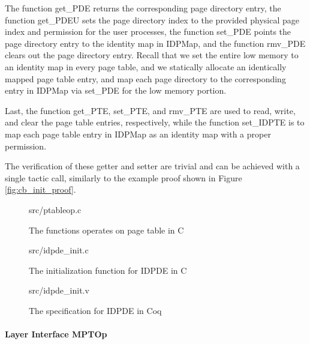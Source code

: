 The function \textsf{get\_PDE} returns the corresponding page directory entry,
the function \textsf{get\_PDEU} sets the page directory index to the
provided physical page index and permission for the user processes, 
the function \textsf{set\_PDE} points the page directory entry to the
identity map in \textsf{IDPMap}, and the function \textsf{rmv\_PDE}
clears out the page directory entry. Recall that we set the entire low memory
to an identity map in every page table, and we statically allocate an identically
mapped page table entry, and map each page directory to the corresponding
entry in \textsf{IDPMap} via \textsf{set\_PDE} for the low memory portion.

Last, the function \textsf{get\_PTE}, \textsf{set\_PTE}, and \textsf{rmv\_PTE}
are used to read, write, and clear the page table entries, respectively, while
the function \textsf{set\_IDPTE} is to map each page table entry in \textsf{IDPMap}
as an identity map with a proper permission.


The verification of these getter and setter are trivial and can be achieved with a single tactic call,
similarly to the example proof shown in Figure \ref{fig:cb_init_proof}.


\begin{figure}
	 {src/ptableop.c}
	\caption{The functions operates on page table in C}
	\label{fig:ptable_op_c}
\end{figure}


\begin{figure}
	 {src/idpde_init.c}
	\caption{The initialization function for IDPDE in C}
	\label{fig:idpde_init_c}
\end{figure}

\begin{figure}
	 {src/idpde_init.v}
	\caption{The specification for IDPDE in Coq}
	\label{fig:idpde_init_v}
\end{figure}

\paragraph{Layer Interface MPTOp}

